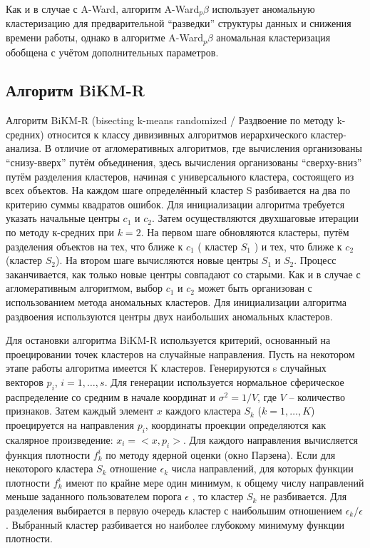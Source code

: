 \documentclass[12pt,tikz]{instruction}
\begin{document}
Как и в случае с A-Ward, алгоритм A-Ward$ _p\beta $ использует аномальную кластеризацию для предварительной ``разведки'' структуры данных и снижения времени работы, однако в алгоритме A-Ward$_p\beta$ аномальная кластеризация обобщена с учётом дополнительных параметров.

\subsection{Алгоритм BiKM-R} 
Алгоритм BiKM-R (bisecting k-means randomized / Раздвоение по методу k-средних) относится к классу дивизивных алгоритмов иерархического кластер-анализа. В отличие от агломеративных алгоритмов, где вычисления организованы ``снизу-вверх'' путём объединения, здесь вычисления организованы ``сверху-вниз'' путём разделения кластеров, начиная с универсального кластера, состоящего из всех объектов. На каждом шаге определённый кластер S разбивается на два по критерию  суммы квадратов ошибок. Для инициализации алгоритма требуется указать начальные центры $c_1$ и $c_2$. Затем осуществляются двухшаговые итерации по методу к-средних при $ k=2 $. На первом шаге обновляются кластеры, путём разделения объектов на тех, что ближе к $c_1$ ( кластер $ S_1 $ ) и тех, что ближе к $c_2$ (кластер $ S_2$). На втором шаге вычисляются новые центры $ S_1 $ и $ S_2 $. Процесс заканчивается, как только новые центры совпадают со старыми. Как и в случае с агломеративным алгоритмом, выбор $c_1$ и $c_2$ может быть организован с использованием метода аномальных кластеров. Для инициализации алгоритма раздвоения используются центры двух наибольших аномальных кластеров.

Для остановки алгоритма BiKM-R используется критерий, основанный на проецировании точек 
кластеров на случайные направления. Пусть на некотором этапе работы алгоритма имеется K кластеров. Генерируются s случайных векторов $p_i$, $i=1,\ldots,s$. Для генерации используется нормальное 
сферическое распределение со средним в начале координат и $\sigma^2=1/V$, где $V$ – количество признаков. 
Затем каждый элемент $x$ каждого кластера $S_k$ ($k=1,\ldots, K$) проецируется на направления $p_i$, 
координаты проекции определяются как скалярное произведение: $x_i=<x,p_i>$. Для каждого направления 
вычисляется функция плотности $f_k^i$ по методу ядерной оценки (окно Парзена). Если для некоторого кластера $S_k$ отношение $\epsilon_k$ числа направлений, для которых функции плотности  $f_k^i$ имеют по крайне мере один минимум, к общему числу направлений меньше заданного пользователем порога $\epsilon$ , то кластер $S_k$ не разбивается. Для разделения выбирается в первую очередь кластер с наибольшим отношением $\epsilon_k / \epsilon$. Выбранный кластер разбивается но наиболее глубокому минимуму функции плотности.  
\end{document}
